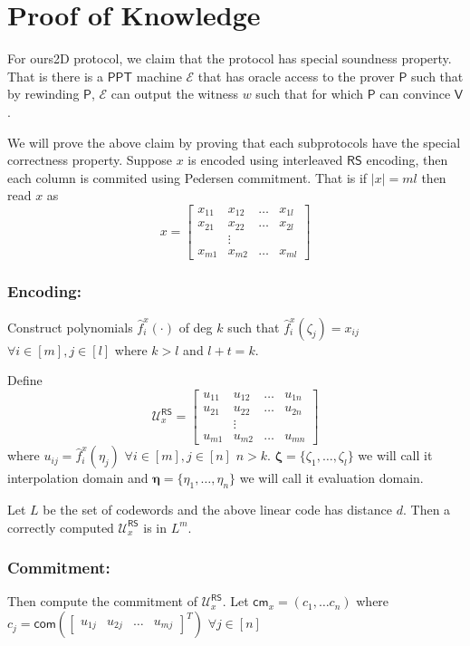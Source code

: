 \documentclass[runningheads]{llncs}
\newcommand{\name}{\textsf{ours}}
\def\ppt{\mathsf{PPT}}
\def\extrac{\mathcal{E}}
\def\prover{\mathsf{P}}
\def\verifier{\mathsf{V}}
\def\RS{\mathsf{RS}} %
\def\cm{\mathsf{cm}} %
\def\com{\mathsf{com}} %
\def\oracle{\mathcal{U}^{\RS}}
\begin{document}
\section{Proof of Knowledge}
	For \name2D protocol, we claim that the protocol has special soundness property. That is there is a $\ppt$ machine $\extrac$ that has oracle access to the prover $\prover$ such that by rewinding $\prover$, $\extrac$ can output the witness $w$ such that for which $\prover$ can convince $\verifier$.
	
	We will prove the above claim by proving that each subprotocols have the special correctness property. 
	Suppose $x$ is encoded using interleaved $\RS$ encoding, then each column is commited using Pedersen commitment. That is if $|x|=ml$ then read $x$ as 
	$$x=
	\begin{bmatrix}
		x_{11} & x_{12} & \ldots & x_{1l}\\
		x_{21} & x_{22} & \ldots & x_{2l}\\
		& \vdots\\
		x_{m1} & x_{m2} & \ldots & x_{ml}
	\end{bmatrix}
	$$	
	\subsubsection{Encoding:}\label{subsec: encode} Construct polynomials $\hat{f}^x_i(\cdot)$ of deg $k$ such that $\hat{f}^x_i(\zeta_j)=x_{ij}$ $\forall i\in [m], j\in [l]$ where $k>l$ and $l+t=k$.
	
	Define 
	$$\oracle_x =
	\begin{bmatrix}
		u_{11} & u_{12} & \ldots & u_{1n}\\
		u_{21} & u_{22} & \ldots & u_{2n}\\
		& \vdots\\
		u_{m1} & u_{m2} & \ldots & u_{mn}
	\end{bmatrix}
	$$
	where $u_{ij}= \hat{f}^x_i(\eta_j)$ $\forall i\in[m], j\in[n]$ $n>k$. $\bm{\zeta}=\{\zeta_1,\ldots,\zeta_l\}$ we will call it interpolation domain and $\bm{\eta} = \{\eta_1,\ldots,\eta_n\}$ we will call it evaluation domain. 
	
	Let $L$ be the set of codewords and the above linear code has distance $d$. Then a correctly computed $\oracle_x$ is in $L^m$.
	
	\subsubsection{Commitment:}\label{subsec: commit} Then compute the commitment of $\oracle_x$. Let $\cm_x=(c_1,\ldots c_n)$ where $c_j= \com( \begin{bmatrix}
	u_{1j} & u_{2j} & \ldots & u_{mj}
	\end{bmatrix}^T)$ $\forall j\in [n]$
\end{document}
